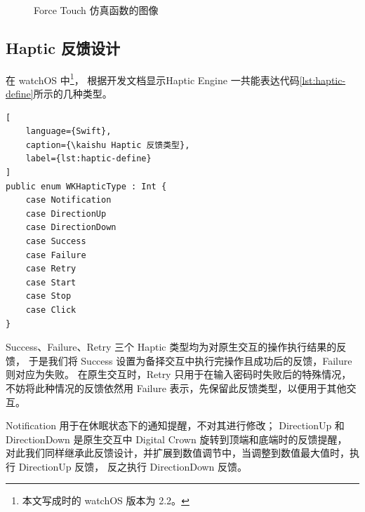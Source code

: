 \begin{figure}[htbp]
\centering
{}
\caption{Force Touch 仿真函数的图像}
\label{fig:ft-fig}

\end{figure}

\subsection{Haptic 反馈设计}
在 watchOS 中\footnote{本文写成时的 watchOS 版本为 2.2。}，
根据开发文档\cite{WatchGuide:2016}显示Haptic Engine 一共能表达代码\ref{lst:haptic-define}所示的几种类型。

\begin{lstlisting}[
    language={Swift},
    caption={\kaishu Haptic 反馈类型},
    label={lst:haptic-define}
]
public enum WKHapticType : Int {
    case Notification
    case DirectionUp
    case DirectionDown
    case Success
    case Failure
    case Retry
    case Start
    case Stop
    case Click
}
\end{lstlisting}

Success、Failure、Retry 三个 Haptic 类型均为对原生交互的操作执行结果的反馈，
于是我们将 Success 设置为备择交互中执行完操作且成功后的反馈，Failure 则对应为失败。
在原生交互时，Retry 只用于在输入密码时失败后的特殊情况，
不妨将此种情况的反馈依然用 Failure 表示，先保留此反馈类型，以便用于其他交互。

Notification 用于在休眠状态下的通知提醒，不对其进行修改；
DirectionUp 和 DirectionDown 是原生交互中 Digital Crown 旋转到顶端和底端时的反馈提醒，
对此我们同样继承此反馈设计，并扩展到数值调节中，当调整到数值最大值时，执行 DirectionUp 反馈，
反之执行 DirectionDown 反馈。

